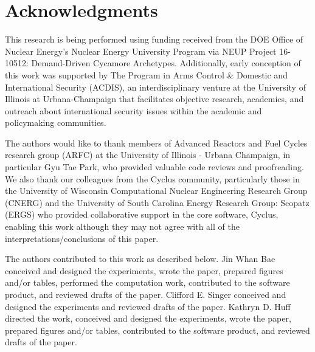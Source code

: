 \section{Acknowledgments}
This research is being performed using funding received from the DOE Office of
Nuclear Energy's Nuclear Energy University Program via NEUP Project 16-10512:
Demand-Driven Cycamore Archetypes. Additionally, early conception of this work was supported by 
The Program in Arms Control \& Domestic and International Security (ACDIS), an
interdisciplinary venture at the University of Illinois at Urbana-Champaign
that facilitates objective research, academics, and outreach about
international security issues within the academic and policymaking communities.

The authors would like to thank  members of Advanced Reactors and Fuel Cycles
research group (ARFC) at the University of Illinois - Urbana Champaign, in
particular Gyu Tae Park, who provided valuable code reviews and proofreading.
We also thank our colleagues from the Cyclus community, particularly those in
the University of Wisconsin Computational Nuclear Engineering Research Group
(CNERG) and the University of South Carolina Energy Research Group: Scopatz
(ERGS) who provided collaborative support in the core software, Cyclus,
enabling this work although they may not agree with all of the
interpretations/conclusions of this paper.  

The authors contributed to this work as described below.  Jin Whan Bae
conceived and designed the experiments, wrote the paper, prepared figures
and/or tables, performed the computation work, contributed to the software
product, and reviewed drafts of the paper.  Clifford E. Singer conceived and
designed the experiments and reviewed drafts of the paper.  Kathryn D. Huff
directed the work, conceived and designed the experiments, wrote the paper,
prepared figures and/or tables, contributed to the software product, and
reviewed drafts of the paper.  


